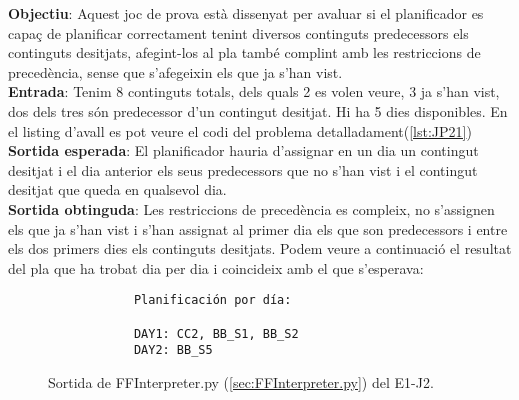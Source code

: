 \documentclass[a4paper]{article}
\begin{document}
	\noindent \textbf{Objectiu}: Aquest joc de prova està dissenyat per avaluar si el planificador es capaç de planificar correctament tenint diversos continguts predecessors els continguts desitjats, afegint-los al pla també complint amb les restriccions de precedència, sense que s'afegeixin els que ja s'han vist. \\
	
	\noindent \textbf{Entrada}: Tenim 8 continguts totals, dels quals 2 es volen veure, 3 ja s'han vist, dos dels tres són predecessor d'un contingut desitjat. Hi ha 5 dies disponibles. En el listing d'avall es pot veure el codi del problema detalladament(\ref{lst:JP21}) \\
	
	\noindent \textbf{Sortida esperada}: El planificador hauria d'assignar en un dia un contingut desitjat i el dia anterior els seus predecessors que no s'han vist i el contingut desitjat que queda en qualsevol dia. \\
	
	\noindent \textbf{Sortida obtinguda}: Les restriccions de 
	precedència es compleix, no s'assignen els que ja s'han vist i s'han assignat al primer dia els que son predecessors i entre els dos primers dies els continguts desitjats. Podem veure a continuació el resultat del pla que ha trobat dia per dia i coincideix amb el que s'esperava:
	
	\begin{figure}[H]
		\centering
		\begin{verbatim}
			Planificación por día:
			
			DAY1: CC2, BB_S1, BB_S2
			DAY2: BB_S5
		\end{verbatim}
		\caption{Sortida de FFInterpreter.py (\ref{sec:FFInterpreter.py}) del E1-J2.}
	\end{figure}	
	
\end{document}
